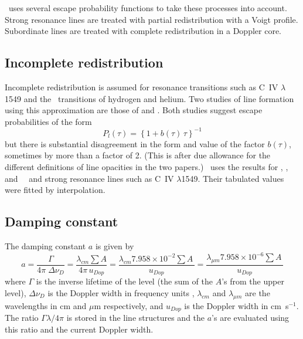 \Cloudy\ uses several escape probability functions to take these processes
into account.
Strong resonance lines are treated with partial redistribution
with a Voigt profile.
Subordinate lines are treated with complete
redistribution in a Doppler core.

\subsection{Incomplete redistribution }

Incomplete redistribution is assumed for resonance transitions such as
C~IV $\lambda$1549 and the \la\ transitions of hydrogen and helium.  Two studies of
line formation using this approximation are those of \citet{Bonihala1979}
and \citet{Hummer1980}.
Both studies suggest escape probabilities of the form
\begin{equation}
{P_l}(\tau ) = {\left\{ {1 + b\left( \tau  \right)\,\tau } \right\}^{
- 1}}%
\end{equation}
but there is substantial disagreement in the form and value of the factor
$b(\tau)$, sometimes by more than a factor of 2.
(This is after due allowance
for the different definitions of line opacities in the two papers.)  \Cloudy\
uses the \citet{Hummer1980} results for \hi, \hei, and \heii\ \la\ and
strong resonance lines such as C~IV $\lambda$1549.
Their tabulated values were fitted
by interpolation.

\subsection{Damping constant }

The damping constant $a$ is given by
\begin{equation}
a = \frac{\Gamma }{{4\pi \;\Delta {\nu _D}}} = \frac{{{\lambda _{cm}}\sum
A }}{{4\pi \,{u_{Dop}}}} = \frac{{{\lambda _{cm}}7.958 \times {{10}^{ -
2}}\sum {A\,} }}{{{u_{Dop}}}} = \frac{{{\lambda _{\mu m}}7.958 \times {{10}^{
- 6}}\sum {A\,} }}{{{u_{Dop}}}}%
\end{equation}
where $\Gamma$ is the inverse lifetime of the level
(the sum of the $A$'s from the
upper level), $\Delta {\nu _D}$
is the Doppler width in frequency units \citep{Mihalas1978},
$\lambda_{cm}$ and $\lambda_{\mu m}$ are
the wavelengths in cm and $\mu$m respectively,
and $u_{Dop}$ is the Doppler width in cm~s$^{-1}$.
The ratio $\Gamma \lambda /4\pi $
is stored in the line structures and the $a$'s are evaluated
using this ratio
and the current Doppler width.

